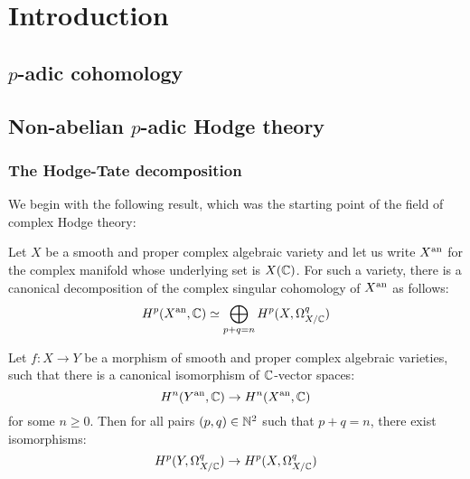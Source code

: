 \chapter{Introduction}
    \section{\texorpdfstring{$p$}{}-adic cohomology}
    
    \section{Non-abelian \texorpdfstring{$p$}{}-adic Hodge theory}
        \subsection{The Hodge-Tate decomposition}
            We begin with the following result, which was the starting point of the field of complex Hodge theory:
            \begin{theorem} \label{theorem: intro_hodge_decomposition}
                Let $X$ be a smooth and proper complex algebraic variety and let us write $X^{\mathrm{an}}$ for the complex manifold whose underlying set is $X(\mathbb{C})$. For such a variety, there is a canonical decomposition of the complex singular cohomology of $X^{\mathrm{an}}$ as follows:
                    $$H^p(X^{\mathrm{an}}, \mathbb{C}) \simeq \bigoplus_{p + q = n} H^p(X, \Omega_{X/\mathbb{C}}^q)$$
            \end{theorem}
            \begin{corollary}
                Let $f: X \to Y$ be a morphism of smooth and proper complex algebraic varieties, such that there is a canonical isomorphism of $\mathbb{C}$-vector spaces:
                    $$H^n(Y^{\mathrm{an}}, \mathbb{C}) \to H^n(X^{\mathrm{an}}, \mathbb{C})$$
                for some $n \geq 0$. Then for all pairs $(p, q) \in \mathbb{N}^2$ such that $p + q = n$, there exist isomorphisms:
                    $$H^p(Y, \Omega_{X/\mathbb{C}}^q) \to H^p(X, \Omega_{X/\mathbb{C}}^q)$$
            \end{corollary}
            
